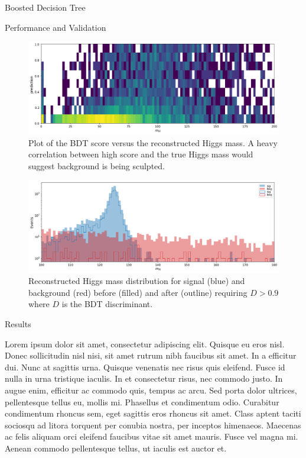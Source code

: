 \begin{section}{Boosted Decision Tree}
\begin{subsection}{Performance and Validation}
\begin{figure}[htb]
\begin{center}
\includegraphics[width=.95\linewidth]{Dissertation/fig/bdt-bkgsculpt1.png}
\end{center}
\caption{Plot of the BDT score versus the reconstructed Higgs mass. A heavy correlation between high score and the true Higgs mass would suggest background is being sculpted.}
\label{fig:bdt-bkgsculpt1}
\end{figure}

\begin{figure}[htb]
\begin{center}
\includegraphics[width=.95\linewidth]{Dissertation/fig/bdt-bkgsculpt2.png}
\end{center}
\caption{Reconstructed Higgs mass distribution for signal (blue) and background (red) before (filled) and after (outline) requiring $D > 0.9$ where $D$ is the BDT discriminant.}
\label{fig:bdt-bkgsculpt2}
\end{figure}
\end{subsection}
\end{section}

\begin{section}{Results}

Lorem ipsum dolor sit amet, consectetur adipiscing elit. Quisque eu eros nisl. Donec sollicitudin nisl nisi, sit amet rutrum nibh faucibus sit amet. In a efficitur dui. Nunc at sagittis urna. Quisque venenatis nec risus quis eleifend. Fusce id nulla in urna tristique iaculis. In et consectetur risus, nec commodo justo. In augue enim, efficitur ac commodo quis, tempus ac arcu. Sed porta dolor ultrices, pellentesque tellus eu, mollis mi. Phasellus et condimentum odio. Curabitur condimentum rhoncus sem, eget sagittis eros rhoncus sit amet. Class aptent taciti sociosqu ad litora torquent per conubia nostra, per inceptos himenaeos. Maecenas ac felis aliquam orci eleifend faucibus vitae sit amet mauris. Fusce vel magna mi. Aenean commodo pellentesque tellus, ut iaculis est auctor et.

\end{section}